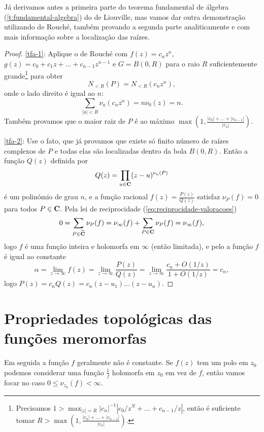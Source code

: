 Já derivamos antes a primeira parte do teorema fundamental de álgebra (\cref{t:fundamental-algebra})
do  de Liouville,
mas vamos dar outra demonstração utilizando  de Rouché,
também provando a segunda parte analiticamente e com mais informação sobre
a localização das raízes.
\tfa*
\begin{proof}
\eqref{tfa-1}: 
Aplique o  de Rouché com $f(z) = c_n z^n$,
$g(z) = c_0 + c_1 z + \dots + c_{n-1} z^{n-1}$ e $G = B(0,R)$
para o raio $R$ suficientemente grande\footnote{Precisamos
$1 > \max_{|z|=R} |c_n|^{-1} |c_0/z^N + \dots + c_{n-1}/z|$,
então é suficiente tomar $R>\max(1,\frac{|c_0|+\dots+|c_{n-1}|}{|c_n|})$.}
para obter
\[ N_{<R}(P) = N_{<R}(c_n z^n), \]
onde o lado direito é igual ao $n$:
\[ \sum_{|a|<R} \nu_a(c_n z^n) = n \nu_0(z) = n. \]
Também provamos que o maior raiz de $P$ é ao máximo $\max(1,\frac{|c_0|+\dots+|c_{n-1}|}{|c_n|})$.

\eqref{tfa-2}: Use o fato, que já provamos que existe só finito número de raízes complexos de $P$
e todas elas são localizadas dentro da bola $B(0,R)$. Então a função $Q(z)$ definida por
\[ Q(z) = \prod_{u\in\mathbf{C}} (z-u)^{\nu_u(P)} \]
é um polinómio de grau $n$, e a função racional $f(z) = \frac{P(z)}{Q(z)}$
satisfaz $\nu_P(f) = 0$ para todos $P\in\mathbf{C}$.
Pela lei de reciprocidade (\cref{eq:reciprocidade-valoracoes})
\[ 0 = \sum_{P\in\widehat{\mathbf{C}}} \nu_P(f) = \nu_\infty(f) + \sum_{P\in\mathbf{C}} \nu_P(f) = \nu_\infty(f), \]
logo $f$ é uma função inteira e holomorfa em $\infty$ (então limitada),
e pelo  a função $f$ é igual ao constante
\[ \alpha = \lim_{z\to\infty} f(z) = \lim_{z\to\infty} \frac{P(z)}{Q(z)} = \lim_{z\to\infty} \frac{c_n + O(1/z)}{1+O(1/z)} = c_n, \]
logo $P(z) = c_n Q(z) = c_n (z-u_1) \dots (z-u_n)$.
\end{proof}


\section{Propriedades topológicas das funções meromorfas}

Em seguida a função $f$ geralmente não é constante.
Se $f(z)$ tem um polo em $z_0$ podemos considerar uma função $\frac{1}{f}$ holomorfa em $z_0$
em vez de $f$, então vamos focar no caso $0\leq \nu_{z_0}(f) < \infty$.

